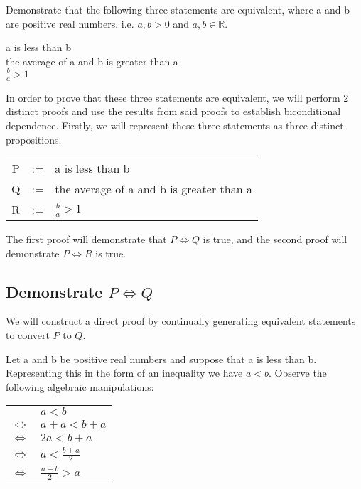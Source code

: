 \begin{raggedright}
Demonstrate that the following three statements are equivalent, where a and b are positive real numbers. i.e. $a,b > 0$ and $a,b \in \mathbb{R}$.
\end{raggedright}
\begin{center}
a is less than b \\
the average of a and b is greater than a \\
$\frac{b}{a} > 1$ \\
\end{center}

In order to prove that these three statements are equivalent, we will perform 2 distinct proofs and use the results from said proofs to establish biconditional dependence. Firstly, we will represent these three statements as three distinct propositions.

\begin{center}
\begin{tabular}{ccl}
  P & := & a is less than b \\
  Q & := & the average of a and b is greater than a \\
  R & := & $\frac{b}{a} > 1$ \\
\end{tabular}
\end{center}

The first proof will demonstrate that $P \iff Q$ is true, and the second proof will demonstrate $P \iff R$ is true.

\subsection{Demonstrate $P \iff Q$}
We will construct a direct proof by continually generating equivalent statements to convert $P$ to $Q$.

Let a and b be positive real numbers and suppose that a is less than b. Representing this in the form of an inequality we have $a < b$. Observe the following algebraic manipulations:

\begin{center}
  \begin{tabular}{cl}
    & $a < b$ \\
    $ \iff $ & $ a + a < b + a$ \\
    $ \iff $ & $ 2a < b + a$ \\
    $ \iff $ & $ a < \frac{b + a}{2}$ \\
    $ \iff $ & $ \frac{a + b}{2} > a$
  \end{tabular}
\end{center}

